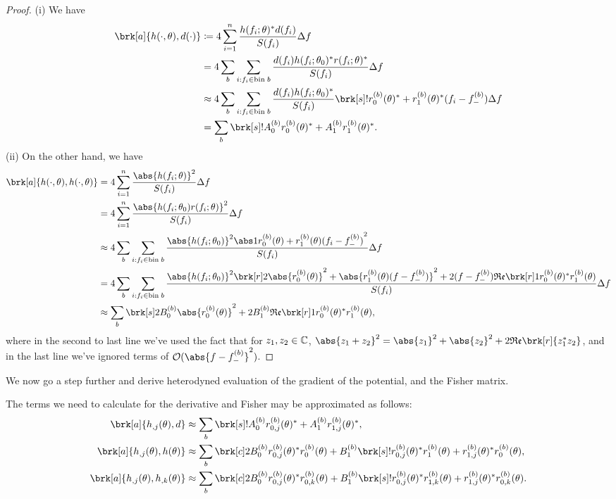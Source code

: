 \begin{proof}
(i) We have
\begin{align*}
\brk[a]{h(\cdot, \theta), d(\cdot)} &\defn 4 \sum_{i=1}^n \frac{h(f_i;\theta)^* d(f_i) }{S(f_i)}\Delta f \\
&= 4 \sum_{b} \sum_{i:f_i \in \text{bin} \; b} \frac{d(f_i) h(f_i;\theta_0)^* r(f_i;\theta)^*}{S(f_i)}\Delta f \\
&\approx 4 \sum_{b} \sum_{i:f_i \in \text{bin} \; b} \frac{d(f_i) h(f_i;\theta_0)^*}{S(f_i)} \brk[s]!{r_0^{(b)}(\theta)^* + r_1^{(b)}(\theta)^*(f_i - f_-^{(b)})} \Delta f\\
&= \sum_b \brk[s]!{A_0^{(b)} r_0^{(b)}(\theta)^* + A_1^{(b)} r_1^{(b)}(\theta)^*}.
\end{align*}
(ii) On the other hand, we have
\begin{align*}
\brk[a]{h(\cdot,\theta), h(\cdot,\theta)} &= 4 \sum_{i=1}^n \frac{\abs{h(f_i;\theta)}^2}{S(f_i)} \Delta f \\
&= 4 \sum_{i=1}^n \frac{\abs{h(f_i;\theta_0)r(f_i;\theta) }^2}{S(f_i)}\Delta f \\
&\approx 4 \sum_b \sum_{i:f_i \in \text{bin} \; b} \frac{\abs{h(f_i;\theta_0)}^2 \abs1{r_0^{(b)}(\theta) + r_1^{(b)}(\theta) (f_i-f_-^{(b)})}^2}{S(f_i)}\Delta f \\
&= 4 \sum_b \sum_{i:f_i \in \text{bin} \; b}\frac{\abs{h(f_i;\theta_0)}^2 \brk[r]2{\abs{r_0^{(b)}(\theta)}^2 + \abs{r_1^{(b)}(\theta)(f-f_-^{(b)})}^2 + 2(f-f_-^{(b)}) \re \brk[r]1{r_0^{(b)}(\theta)^*r_1^{(b)}(\theta)}}}{S(f_i)}\Delta f \\
&\approx \sum_b \brk[s]2{B_0^{(b)} \abs{r_0^{(b)}(\theta)}^2 + 2B_1^{(b)} \re \brk[r]1{r_0^{(b)}(\theta)^* r_1^{(b)}(\theta)}},
\end{align*}
where in the second to last line we've used the fact that for $z_1, z_2 \in \mathbb{C}$, $\abs{z_1+z_2}^2 = \abs{z_1}^2 + \abs{z_2}^2 + 2 \re \brk[r]{z_1^* z_2}$, and in the last line we've ignored terms of $\order(\abs{f-f_-^{(b)}}^2)$.
\end{proof}
We now go a step further and derive heterodyned evaluation of the gradient of the potential, and the Fisher matrix.
\begin{proposition}[]\label{}
The terms we need to calculate for the derivative and Fisher may be approximated as follows:
\begin{align*}
\brk[a]{h_{,j}(\theta),d} &\approx \sum_b \brk[s]!{A_0^{(b)} r_{0,j}^{(b)} (\theta)^* + A_1^{(b)} r_{1,j}^{(b)}(\theta)^*}, \\
\brk[a]{h_{,j}(\theta), h(\theta)} &\approx \sum_b \brk[c]2{B_0^{(b)} r_{0,j}^{(b)}(\theta)^* r_0^{(b)}(\theta) + B_1^{(b)} \brk[s]!{r_{0,j}^{(b)}(\theta)^* r_1^{(b)}(\theta) + r_{1,j}^{(b)}(\theta)^* r_0^{(b)}(\theta)}}, \\
\brk[a]{h_{,j}(\theta), h_{,k}(\theta)} &\approx \sum_b \brk[c]2{B_0^{(b)} r_{0,j}^{(b)}(\theta)^* r_{0,k}^{(b)}(\theta) + B_1^{(b)} \brk[s]!{r_{0,j}^{(b)}(\theta)^* r_{1,k}^{(b)}(\theta) + r_{1,j}^{(b)}(\theta)^* r_{0,k}^{(b)}(\theta)}}.
\end{align*}
\end{proposition}
